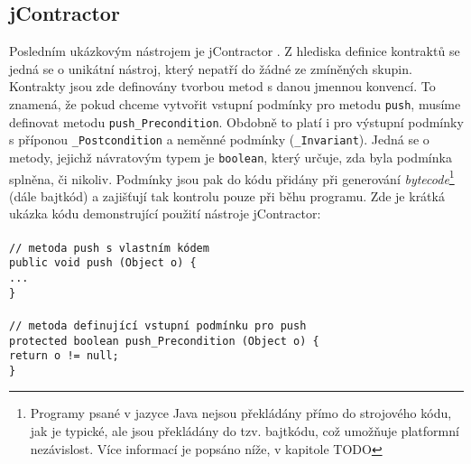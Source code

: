 		
		\subsection{jContractor}
			Posledním ukázkovým nástrojem je jContractor \cite{jcontractor}. Z hlediska definice kontraktů se jedná se o unikátní nástroj, který nepatří do žádné ze zmíněných skupin. Kontrakty jsou zde definovány tvorbou metod s danou jmennou konvencí. To znamená, že pokud chceme vytvořit vstupní podmínky pro metodu \texttt{push}, musíme definovat metodu \texttt{push\_Precondition}. Obdobně to platí i pro výstupní podmínky s příponou \texttt{\_Postcondition} a neměnné podmínky (\texttt{\_Invariant}). Jedná se o metody, jejichž návratovým typem je \texttt{boolean}, který určuje, zda byla podmínka splněna, či nikoliv. Podmínky jsou pak do kódu přidány při generování \emph{bytecode}\footnote{Programy psané v jazyce Java nejsou překládány přímo do strojového kódu, jak je typické, ale jsou překládány do tzv. bajtkódu, což umožňuje platformní nezávislost. Více informací je popsáno níže, v kapitole TODO} (dále bajtkód) a zajišťují tak kontrolu pouze při běhu programu. Zde je krátká ukázka kódu demonstrující použití nástroje jContractor:\\\\  
				\- \- \- \- \- \texttt{\textcolor{pgrey}{// metoda push s vlastním kódem}}\\
				\- \- \- \- \- \texttt{public void push (Object o) \{}\\
				\- \- \- \- \- \- \- \- \- \- \texttt{...}\\
				\- \- \- \- \- \texttt{\}}\\\\
				\- \- \- \- \- \texttt{\textcolor{pgrey}{// metoda definující vstupní podmínku pro push}}\\
				\- \- \- \- \- \texttt{protected boolean push\_Precondition (Object o) \{}\\
				\- \- \- \- \- \- \- \- \- \- \texttt{return o != null;}\\
				\- \- \- \- \- \texttt{\}}\\
				

